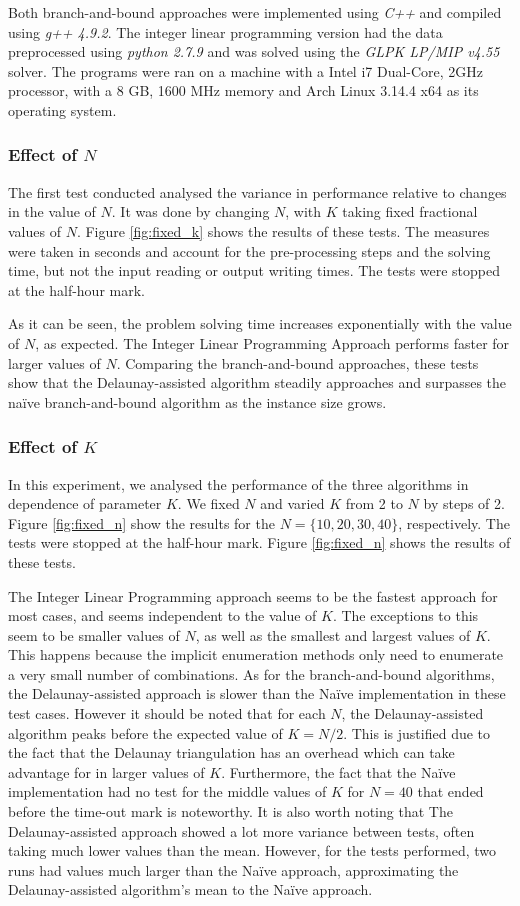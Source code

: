 Both branch-and-bound approaches were implemented using \emph{C++} and compiled using \emph{g++ 4.9.2}. The integer linear programming version had the data preprocessed using \emph{python 2.7.9} and was solved using the \emph{GLPK LP/MIP v4.55} solver. The programs were ran on a machine with a Intel i7 Dual-Core, 2GHz processor, with a 8 GB, 1600 MHz memory and Arch Linux 3.14.4 x64 as its operating system.

\subsubsection*{Effect of $N$}

The first test conducted analysed the variance in performance relative to changes in the value of $N$. It was done by changing $N$, with $K$ taking fixed fractional values of $N$. Figure \ref{fig:fixed_k} shows the results of these tests. The measures were taken in seconds and account for the pre-processing steps and the solving time, but not the input reading or output writing times. The tests were stopped at the half-hour mark. 

\noindent
As it can be seen, the problem solving time increases exponentially with the value of $N$, as expected.
The Integer Linear Programming Approach performs faster for larger values of $N$. Comparing the branch-and-bound approaches, these tests show that the Delaunay-assisted algorithm steadily approaches and surpasses the naïve branch-and-bound algorithm as the instance size grows.
\subsubsection*{Effect of $K$}
In this experiment, we analysed the performance of the three algorithms in dependence of parameter $K$. We fixed $N$ and varied $K$ from 2 to $N$ by steps of 2. Figure \ref{fig:fixed_n} show the results for the $N=\{10,20,30,40\}$, respectively. The tests were stopped at the half-hour mark. Figure \ref{fig:fixed_n} shows the results of these tests.

\noindent
The Integer Linear Programming approach seems to be the fastest approach for most cases, and seems independent to the value of $K$. The exceptions to this seem to be smaller values of $N$, as well as the smallest and largest values of $K$. This happens because the implicit enumeration methods only need to enumerate a very small number of combinations.
As for the branch-and-bound algorithms, the Delaunay-assisted approach is slower than the Naïve implementation in these test cases. However it should be noted that for each $N$, the Delaunay-assisted algorithm peaks before the expected value of $K=N/2$. This is justified due to the fact that the Delaunay triangulation has an overhead which can take advantage for in larger values of $K$.
Furthermore, the fact that the Naïve implementation had no test for the middle values of $K$ for $N=40$ that ended before the time-out mark is noteworthy.
It is also worth noting that The Delaunay-assisted approach showed a lot more variance between tests, often taking much lower values than the mean. However, for the tests performed, two runs had values much larger than the Naïve approach, approximating the Delaunay-assisted algorithm's mean to the Naïve approach.

